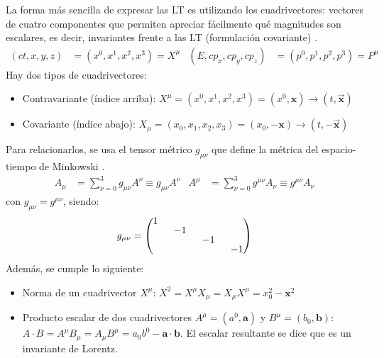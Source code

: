 La forma más sencilla de expresar las LT es utilizando los cuadrivectores: vectores de cuatro componentes que permiten apreciar fácilmente qué magnitudes son escalares, es decir, invariantes frente a las LT (formulación covariante) \cite{MCR}.
\begin{align}
(ct,x, y, z) &=(x^0, x^1, x^2, x^3)=X^\mu & (E,cp_x, cp_y, cp_z) &=(p^0, p^1, p^2, p^3)=P^\mu
\end{align}
Hay dos tipos de cuadrivectores:
\begin{itemize}
\item Contravariante (índice arriba): $X^\mu=(x^0, x^1, x^2, x^3)=(x^0,\textbf{x}) \rightarrow (t,\vec{\boldsymbol{x}})$
\item Covariante (índice abajo): $X_\mu=(x_0, x_1, x_2, x_3)=(x_0,-\textbf{x}) \rightarrow (t,-\vec{\boldsymbol{x}})$
\end{itemize} 
Para relacionarlos, se usa el tensor métrico $g_{\mu\nu}$ que define la métrica del espacio-tiempo de Minkowski \cite{MCR}.
\begin{align}
A_{\mu } &=\sum ^{3}_{\nu =0}g_{\mu \nu }A^{\nu} \equiv g_{\mu \nu }A^{\nu} & A^{\mu } &=\sum ^{3}_{\nu =0}g^{\mu \nu }A_{\nu} \equiv g^{\mu \nu }A_{\nu} \label{eq:metrica}
\end{align}
con $g_{\mu\nu} = g^{\mu\nu}$, siendo:
\begin{equation}
g_{\mu\nu} = 
\begingroup 
\renewcommand*{\arraystretch}{0.8}
\setlength\arraycolsep{8pt}
\begin{pmatrix}
1 & & &  \\
& -1 & & \\
& & -1 & \\
& & & -1
\end{pmatrix}
\endgroup
\end{equation}
Además, se cumple lo siguiente:
\begin{itemize}
\item Norma de un cuadrivector $X^\mu$: $X^{2}=X^{\mu }X_{\mu }=X_{\mu }X^{\mu }=x_{0}^{2}-\boldsymbol{x}^{2}$
\item Producto escalar de dos cuadrivectores $A^{\mu}=\left( a^{0},\boldsymbol{a}\right)$ y $B^{\mu}=\left( b_{0},\boldsymbol{b}\right)$: $A\cdot B=A^{\mu }B_{\mu }=A_{\mu }B^{\mu }=a_{0}b^{0}- \boldsymbol{a}\cdot \boldsymbol{b}$. El escalar resultante se dice que es un invariante de Lorentz.
\end{itemize}

